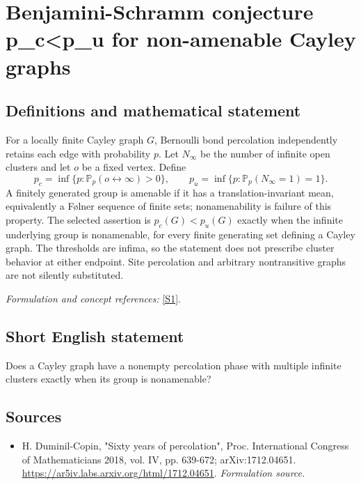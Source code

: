 \documentclass[11pt]{article}
\begin{document}
\section*{\texorpdfstring{Benjamini-Schramm conjecture p\_c<p\_u for non-amenable Cayley graphs}{Benjamini-Schramm conjecture p\_c<p\_u for non-amenable Cayley graphs}}\label{360}
\subsection{Definitions and mathematical statement}
For a locally finite Cayley graph $G$, Bernoulli bond percolation independently retains each edge with probability $p$. Let $N_\infty$ be the number of infinite open clusters and let $o$ be a fixed vertex. Define
\[
 p_c=\inf\{p:{\mathbb{P}}_p(o\leftrightarrow\infty)>0\},\qquad
 p_u=\inf\{p:{\mathbb{P}}_p(N_\infty=1)=1\}.
\]
A finitely generated group is amenable if it has a translation-invariant mean, equivalently a F\o lner sequence of finite sets; nonamenability is failure of this property. The selected assertion is $p_c(G)<p_u(G)$ exactly when the infinite underlying group is nonamenable, for every finite generating set defining a Cayley graph. The thresholds are infima, so the statement does not prescribe cluster behavior at either endpoint. Site percolation and arbitrary nontransitive graphs are not silently substituted.
\par\smallskip\textit{Formulation and concept references:} \href{https://ar5iv.labs.arxiv.org/html/1712.04651}{[S1]}.

\subsection{Short English statement}
Does a Cayley graph have a nonempty percolation phase with multiple infinite clusters exactly when its group is nonamenable?
\subsection{Sources}
\begin{itemize}
\item[S1]H. Duminil-Copin, "Sixty years of percolation", Proc. International Congress of Mathematicians 2018, vol. IV, pp. 639-672; arXiv:1712.04651.
\url{https://ar5iv.labs.arxiv.org/html/1712.04651}.
\textit{Formulation source.}
\end{itemize}
\end{document}
